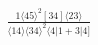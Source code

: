\documentclass[varwidth, border=5pt]{standalone}
\begin{document}
\begin{my}
$\begin{gathered}
\scriptscriptstyle\frac{1⟨45⟩^2[34]⟨23⟩}{⟨14⟩⟨34⟩^2⟨4|1+3|4]}
\end{gathered}$
\end{my}
\end{document}
